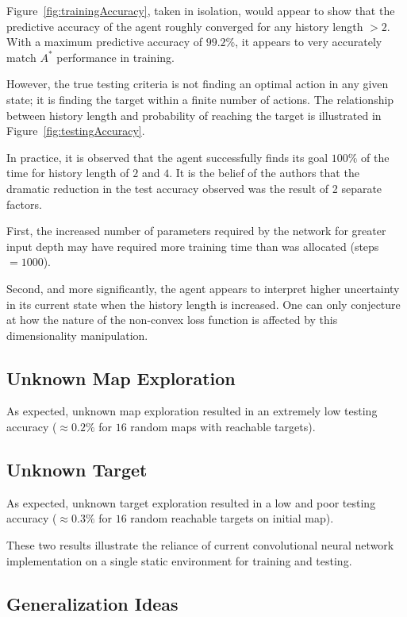 \documentclass{article}
\begin{document}
Figure~\ref{fig:trainingAccuracy}, taken in isolation, would appear to show that the predictive accuracy of the agent roughly converged for any history length $>2$. With a maximum predictive accuracy of $99.2\%$, it appears to very accurately match $A^*$ performance in training.

However, the true testing criteria is not finding an optimal action in any given state; it is finding the target within a finite number of actions. The relationship between history length and probability of reaching the target is illustrated in Figure~\ref{fig:testingAccuracy}.

In practice, it is observed that the agent successfully finds its goal $100\%$ of the time for history length of $2$ and $4$. It is the belief of the authors that the dramatic reduction in the test accuracy observed was the result of 2 separate factors.

First, the increased number of parameters required by the network for greater input depth may have required more training time than was allocated (steps$=1000$).

Second, and more significantly, the agent appears to interpret higher uncertainty in its current state when the history length is increased. One can only conjecture at how the nature of the non-convex loss function is affected by this dimensionality manipulation.

\subsection{Unknown Map Exploration} \label{ssec:unk}
As expected, unknown map exploration resulted in an extremely low testing accuracy ($\approx 0.2\%$ for $16$ random maps with reachable targets). 

\subsection{Unknown Target} \label{ssec:unkt}
As expected, unknown target exploration resulted in a low and poor testing accuracy ($\approx 0.3\%$ for $16$ random reachable targets on initial map).

These two results illustrate the reliance of current convolutional neural network implementation on a single static environment for training and testing.

\subsection{Generalization Ideas} \label{ssec:gen}
\end{document}
